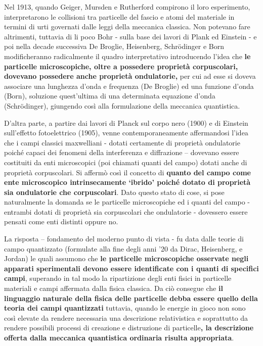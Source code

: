 Nel 1913, quando Geiger, Mursden e Rutherford compirono il loro
esperimento, interpretarono le collisioni tra particelle del fascio e
atomi del materiale in termini di urti governati dalle leggi della
meccanica classica.
Non potevano fare altrimenti, tuttavia di li poco
Bohr - sulla base dei lavori di Plank ed Einstein - e poi nella decade
successiva De Broglie, Heisenberg, Schrödinger e Born modificheranno
radicalmente il quadro interpretativo introducendo l'idea che \textbf{le
particelle microscopiche, oltre a possedere proprietà corpuscolari,
	dovevano possedere anche proprietà ondulatorie,} per cui ad esse si
doveva associare una lunghezza d'onda e frequenza (De Broglie) ed una
funzione d'onda (Born), soluzione quest'ultima di una determinata
equazione d'onda (Schrödinger), giungendo così alla formulazione della meccanica quantistica.

D'altra parte, a partire dai lavori di Planck sul corpo nero (1900) e di
Einstein sull'effetto fotoelettrico (1905), venne contemporaneamente
affermandosi l'idea che i campi classici maxwelliani - dotati certamente
di proprietà ondulatorie poiché capaci dei fenomeni della interferenza e
diffrazione -- dovevano essere costituiti da enti microscopici (poi
chiamati quanti del campo) dotati anche di proprietà corpuscolari.
Si affermò così il concetto di \textbf{quanto del campo come ente
microscopico intrinsecamente `ibrido' poiché dotato di proprietà sia
ondulatorie che corpuscolari}.
Dato questo stato di cose, si pose naturalmente la domanda se le particelle microscopiche ed i quanti del campo -
entrambi dotati di proprietà sia corpuscolari che ondulatorie - dovessero essere pensati come enti distinti oppure no.

La risposta -- fondamento del moderno punto di vista - fu data dalle
teorie di campo quantizzato (formulate alla fine degli anni '20 da
Dirac, Heisenberg, e Jordan) le quali assumono che \textbf{le particelle
microscopiche osservate negli apparati sperimentali devono essere
identificate con i quanti di specifici campi}, superando in tal modo la
ripartizione degli enti fisici in particelle materiali e campi affermata
dalla fisica classica.
Da ciò consegue che \textbf{il linguaggio
naturale della fisica delle particelle debba essere quello della teoria
dei campi quantizzati} tuttavia, quando le energie in gioco non sono
così elevate da rendere necessaria una descrizione relativistica e
soprattutto da rendere possibili processi di creazione e distruzione di
particelle\textbf{, la descrizione offerta dalla meccanica quantistica
ordinaria risulta appropriata}.

